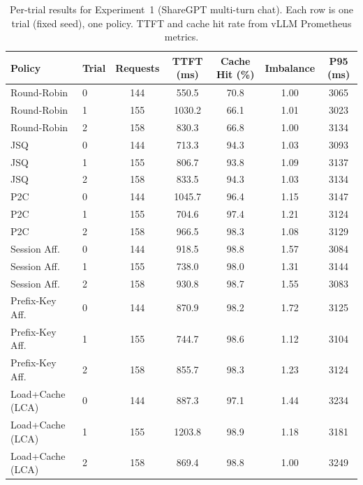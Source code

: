 \documentclass{article}
\begin{document}
\begin{table}[h]
    \caption{Per-trial results for Experiment~1 (ShareGPT multi-turn chat). Each row is one trial (fixed seed), one policy. TTFT and cache hit rate from vLLM Prometheus metrics.}
    \label{tab:per_trial}
    \centering
    \small
    \begin{tabular}{@{}llccccc@{}}
        \toprule
        \textbf{Policy} & \textbf{Trial} & \textbf{Requests} & \textbf{TTFT (ms)} & \textbf{Cache Hit (\%)} & \textbf{Imbalance} & \textbf{P95 (ms)} \\
        \midrule
        Round-Robin     & 0 & 144 & 550.5 & 70.8 & 1.00 & 3065 \\
        Round-Robin     & 1 & 155 & 1030.2 & 66.1 & 1.01 & 3023 \\
        Round-Robin     & 2 & 158 & 830.3 & 66.8 & 1.00 & 3134 \\
        \midrule
        JSQ             & 0 & 144 & 713.3 & 94.3 & 1.03 & 3093 \\
        JSQ             & 1 & 155 & 806.7 & 93.8 & 1.09 & 3137 \\
        JSQ             & 2 & 158 & 833.5 & 94.3 & 1.03 & 3134 \\
        \midrule
        P2C             & 0 & 144 & 1045.7 & 96.4 & 1.15 & 3147 \\
        P2C             & 1 & 155 & 704.6 & 97.4 & 1.21 & 3124 \\
        P2C             & 2 & 158 & 966.5 & 98.3 & 1.08 & 3129 \\
        \midrule
        Session Aff.    & 0 & 144 & 918.5 & 98.8 & 1.57 & 3084 \\
        Session Aff.    & 1 & 155 & 738.0 & 98.0 & 1.31 & 3144 \\
        Session Aff.    & 2 & 158 & 930.8 & 98.7 & 1.55 & 3083 \\
        \midrule
        Prefix-Key Aff. & 0 & 144 & 870.9 & 98.2 & 1.72 & 3125 \\
        Prefix-Key Aff. & 1 & 155 & 744.7 & 98.6 & 1.12 & 3104 \\
        Prefix-Key Aff. & 2 & 158 & 855.7 & 98.3 & 1.23 & 3124 \\
        \midrule
        Load+Cache (LCA) & 0 & 144 & 887.3 & 97.1 & 1.44 & 3234 \\
        Load+Cache (LCA) & 1 & 155 & 1203.8 & 98.9 & 1.18 & 3181 \\
        Load+Cache (LCA) & 2 & 158 & 869.4 & 98.8 & 1.00 & 3249 \\
        \bottomrule
    \end{tabular}
\end{table}
\end{document}
